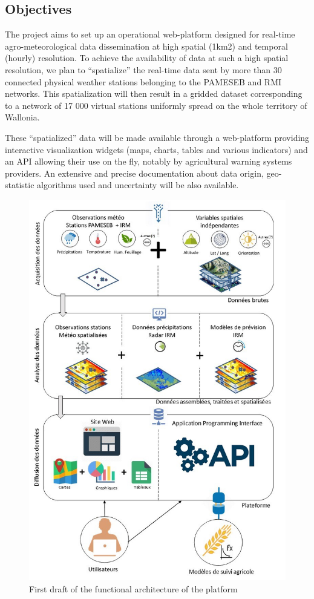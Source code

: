 \documentclass[12pt,twoside]{reedthesis}
\theoremstyle{definition}
\theoremstyle{definition}
\theoremstyle{definition}
\theoremstyle{remark}
\begin{document}
\subsection{Objectives}\label{objectives}

The project aims to set up an operational web-platform designed for
real-time agro-meteorological data dissemination at high spatial (1km2)
and temporal (hourly) resolution. To achieve the availability of data at
such a high spatial resolution, we plan to ``spatialize'' the real-time
data sent by more than 30 connected physical weather stations belonging
to the PAMESEB and RMI networks. This spatialization will then result in
a gridded dataset corresponding to a network of 17 000 virtual stations
uniformly spread on the whole territory of Wallonia.

These ``spatialized'' data will be made available through a web-platform
providing interactive visualization widgets (maps, charts, tables and
various indicators) and an API allowing their use on the fly, notably by
agricultural warning systems providers. An extensive and precise
documentation about data origin, geo-statistic algorithms used and
uncertainty will be also available.
\begin{figure}

{\centering \includegraphics[width=0.65\linewidth]{figure/agromet} 

}

\caption{First draft of the functional architecture of the platform}\label{fig:agromet}
\end{figure}
\end{document}
